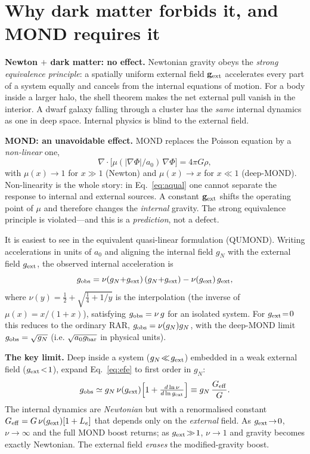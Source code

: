 \documentclass[aps,prd,twocolumn,10pt,nofootinbib]{revtex4-2}
\begin{document}
\section{Why dark matter forbids it, and MOND requires it}
\textbf{Newton $+$ dark matter: no effect.} Newtonian gravity obeys the \emph{strong equivalence principle}: a
spatially uniform external field $\mathbf{g}_{\rm ext}$ accelerates every part of a system equally and cancels
from the internal equations of motion. For a body inside a larger halo, the shell theorem makes the net external
pull vanish in the interior. A dwarf galaxy falling through a cluster has the \emph{same} internal dynamics as
one in deep space. Internal physics is blind to the external field.

\textbf{MOND: an unavoidable effect.} MOND replaces the Poisson equation by a \emph{non-linear} one,
\begin{equation}
\nabla\!\cdot\!\big[\mu(|\nabla\Phi|/a_0)\,\nabla\Phi\big]=4\pi G\rho,
\label{eq:aqual}
\end{equation}
with $\mu(x)\!\to\!1$ for $x\!\gg\!1$ (Newton) and $\mu(x)\!\to\!x$ for $x\!\ll\!1$ (deep-MOND). Non-linearity is
the whole story: in Eq.~\eqref{eq:aqual} one cannot separate the response to internal and external sources. A
constant $\mathbf{g}_{\rm ext}$ shifts the operating point of $\mu$ and therefore changes the \emph{internal}
gravity. The strong equivalence principle is violated---and this is a \emph{prediction}, not a defect.

It is easiest to see in the equivalent quasi-linear formulation (QUMOND). Writing accelerations in units of
$a_0$ and aligning the internal field $g_N$ with the external field $g_{\rm ext}$, the observed internal
acceleration is
\begin{equation}
g_{\rm obs}=\nu(g_N{+}g_{\rm ext})\,(g_N{+}g_{\rm ext})-\nu(g_{\rm ext})\,g_{\rm ext},
\label{eq:efe}
\end{equation}
where $\nu(y)=\tfrac12+\sqrt{\tfrac14+1/y}$ is the interpolation (the inverse of $\mu(x)=x/(1{+}x)$), satisfying
$g_{\rm obs}=\nu\,g$ for an isolated system. For $g_{\rm ext}\!=\!0$ this reduces to the ordinary RAR,
$g_{\rm obs}=\nu(g_N)g_N$, with the deep-MOND limit $g_{\rm obs}=\sqrt{g_N}$ (i.e. $\sqrt{a_0 g_{\rm bar}}$ in
physical units).

\textbf{The key limit.} Deep inside a system ($g_N\!\ll\!g_{\rm ext}$) embedded in a weak external field
($g_{\rm ext}\!<\!1$), expand Eq.~\eqref{eq:efe} to first order in $g_N$:
\begin{equation}
g_{\rm obs}\simeq g_N\,\nu(g_{\rm ext})\Big[1+\tfrac{d\ln\nu}{d\ln g_{\rm ext}}\Big]
\equiv g_N\,\frac{G_{\rm eff}}{G}.
\label{eq:geff}
\end{equation}
The internal dynamics are \emph{Newtonian} but with a renormalised constant $G_{\rm eff}=G\,\nu(g_{\rm ext})
[1+L_e]$ that depends only on the \emph{external} field. As $g_{\rm ext}\!\to\!0$, $\nu\!\to\!\infty$ and the
full MOND boost returns; as $g_{\rm ext}\!\gg\!1$, $\nu\!\to\!1$ and gravity becomes exactly Newtonian. The
external field \emph{erases} the modified-gravity boost.
\end{document}
